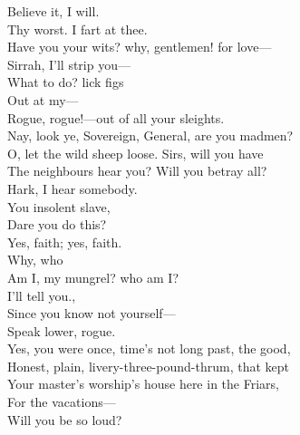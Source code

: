 \documentclass[a4paper,oneside,12pt]{memoir}
\begin{document}
\begin{drama*}

\item \xspace

\act

\scene

\facespeaks Believe it, I will.\\
\subtlespeaks {} Thy worst. I fart at thee.\\
\dolspeaks Have you your wits? why, gentlemen! for love---\\
\facespeaks Sirrah, I'll strip you---\\
\subtlespeaks {} What to do? lick figs\\
Out at my---\\
\facespeaks {} Rogue, rogue!---out of all your sleights.\\
\dolspeaks Nay, look ye, Sovereign, General, are you madmen?\\
\subtlespeaks O, let the wild sheep loose.
\dolspeaks {} Sirs, will you have\\
The neighbours hear you? Will you betray all?\\
Hark, I hear somebody.\\
\facespeaks {} You insolent slave,\\
Dare you do this?\\
\subtlespeaks {} Yes, faith; yes, faith.\\
\facespeaks {} Why, who\\
Am I, my mungrel? who am I?\\
\subtlespeaks {} I'll tell you.,\\
Since you know not yourself---\\
\facespeaks {} Speak lower, rogue.\\
\subtlespeaks Yes, you were once, time's not long past, the good,\\
Honest, plain, livery-three-pound-thrum, that kept\\
Your master's worship's house here in the Friars,\\
For the vacations---\\
\facespeaks {} Will you be so loud?\\

\end{drama*}
\end{document}
